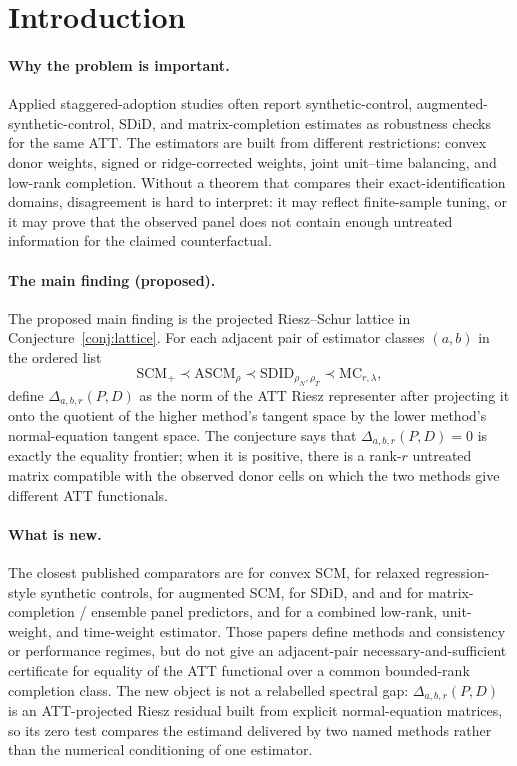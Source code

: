 \documentclass[11pt]{article}
\theoremstyle{definition}
\theoremstyle{plain}
\theoremstyle{remark}
\begin{document}
\section{Introduction}
\paragraph{Why the problem is important.}
Applied staggered-adoption studies often report synthetic-control,
augmented-synthetic-control, SDiD, and matrix-completion estimates as
robustness checks for the same ATT. The estimators are built from different
restrictions: convex donor weights, signed or ridge-corrected weights, joint
unit--time balancing, and low-rank completion. Without a theorem that compares
their exact-identification domains, disagreement is hard to interpret: it may
reflect finite-sample tuning, or it may prove that the observed panel does not
contain enough untreated information for the claimed counterfactual.

\paragraph{The main finding (proposed).}
The proposed main finding is the projected Riesz--Schur lattice in
Conjecture~\ref{conj:lattice}. For each adjacent pair of estimator classes
$(a,b)$ in the ordered list
\[
  \mathrm{SCM}_{+}\prec \mathrm{ASCM}_{\rho}\prec
  \mathrm{SDID}_{\rho_N,\rho_T}\prec \mathrm{MC}_{r,\lambda},
\]
define $\Delta_{a,b,r}(P,D)$ as the norm of the ATT Riesz representer after
projecting it onto the quotient of the higher method's tangent space by the
lower method's normal-equation tangent space. The conjecture says that
$\Delta_{a,b,r}(P,D)=0$ is exactly the equality frontier; when it is positive,
there is a rank-$r$ untreated matrix compatible with the observed donor cells
on which the two methods give different ATT functionals.

\paragraph{What is new.}
The closest published comparators are \citet{AbadieDiamondHainmueller2010}
for convex SCM, \citet{DoudchenkoImbens2016} for relaxed regression-style
synthetic controls, \citet{BenMichaelFellerRothstein2021} for augmented SCM,
\citet{ArkhangelskyAtheyHirshbergImbensWager2021} for SDiD, and
\citet{AtheyBayatiDoudchenkoImbensKhosravi2021} and
\citet{AtheyBayatiImbensQu2019} for matrix-completion / ensemble panel
predictors, and \citet[arXiv v3 abstract and Section~2 estimator definition]{AtheyImbensQuViviano2025}
for a combined low-rank, unit-weight, and time-weight estimator. Those papers define methods and
consistency or performance regimes, but do not give an adjacent-pair
necessary-and-sufficient certificate for equality of the ATT functional over a
common bounded-rank completion class. The new object is not a relabelled
spectral gap: $\Delta_{a,b,r}(P,D)$ is an ATT-projected Riesz residual built
from explicit normal-equation matrices, so its zero test compares the estimand
delivered by two named methods rather than the numerical conditioning of one
estimator.
\end{document}
